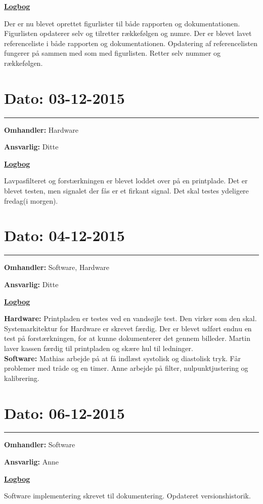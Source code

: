 \underline{\textbf{Logbog}}

Der er nu blevet oprettet figurlister til både rapporten og dokumentationen. Figurlisten opdaterer selv og tilretter rækkefølgen og numre. Der er blevet lavet referenceliste i både rapporten og dokumentationen. Opdatering af referencelisten fungerer på sammen med som med figurlisten. Retter selv nummer og rækkefølgen.  
\\

\section{Dato: 03-12-2015}
\hrule
\textbf{Omhandler:} Hardware

\textbf{Ansvarlig:} Ditte  

\underline{\textbf{Logbog}}

Lavpasfilteret og forstærkningen er blevet loddet over på en printplade. Det er blevet testen, men signalet der fås er et firkant signal. Det skal testes ydeligere fredag(i morgen).  
\\

\section{Dato: 04-12-2015}
\hrule
\textbf{Omhandler:} Software, Hardware

\textbf{Ansvarlig:} Ditte  

\underline{\textbf{Logbog}}


\textbf{Hardware: }Printpladen er testes ved en vandsøjle test. Den virker som den skal. Systemarkitektur for Hardware er skrevet færdig. Der er blevet udført endnu en test på forstærkningen, for at kunne dokumenterer det gennem billeder. Martin laver kassen færdig til printpladen og skære hul til ledninger. \\
\textbf{Software: }Mathias arbejde på at få indlæst systolisk og diastolisk tryk. Får problemer med tråde og en timer. Anne arbejde på filter, nulpunktjustering og kalibrering.    
\newpage
\section{Dato: 06-12-2015}
\hrule
\textbf{Omhandler:} Software

\textbf{Ansvarlig:} Anne 

\underline{\textbf{Logbog}}

Software implementering skrevet til dokumentering. Opdateret versionshistorik.   
\\

